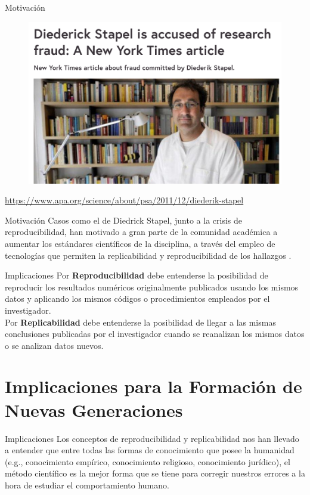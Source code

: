 \documentclass{beamer}
\begin{document}
\begin{frame}{Motivación}
\begin{figure}
\includegraphics[width=.7\textwidth]{stapel.png}
\end{figure}
\scriptsize
\textcolor{blue}{\url{https://www.apa.org/science/about/psa/2011/12/diederik-stapel}}
\end{frame}

\begin{frame}{Motivación}
Casos como el de Diedrick Stapel, junto a la crisis de reproducibilidad, han motivado a gran parte de la comunidad académica a aumentar los estándares científicos de la disciplina, a través del empleo de tecnologías que permiten la replicabilidad y reproducibilidad de los hallazgos \cite{Epskamp2019}.
\end{frame}

\begin{frame}{Implicaciones}
Por \textcolor{blue!46!green}{\textbf{Reproducibilidad}} debe entenderse la posibilidad de reproducir los resultados numéricos originalmente publicados usando los mismos datos y aplicando los mismos códigos o procedimientos empleados por el investigador.   \\
\vspace{0.5cm}
Por \textcolor{blue!46!green}{\textbf{Replicabilidad}} debe entenderse la posibilidad de llegar a las mismas conclusiones publicadas por el investigador cuando se reanalizan los mismos datos o se analizan datos nuevos.
\end{frame}

\section{Implicaciones para la Formación de Nuevas Generaciones}
\begin{frame}{Implicaciones}
Los conceptos de reproducibilidad y replicabilidad nos han llevado a entender que entre todas las formas de conocimiento que posee la humanidad (e.g., conocimiento empírico, conocimiento religioso, conocimiento jurídico), el método científico es la mejor forma que se tiene para corregir nuestros errores a la hora de estudiar el comportamiento humano. 
\end{frame}
\end{document}
